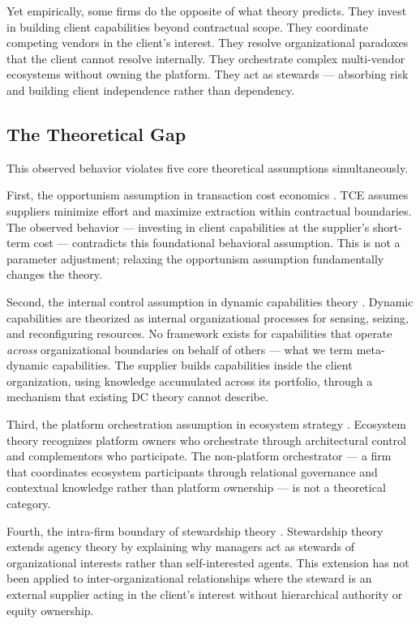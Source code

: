 Yet empirically, some firms do the opposite of what theory predicts. They invest in building client capabilities beyond contractual scope. They coordinate competing vendors in the client's interest. They resolve organizational paradoxes that the client cannot resolve internally. They orchestrate complex multi-vendor ecosystems without owning the platform. They act as stewards --- absorbing risk and building client independence rather than dependency.

\subsection{The Theoretical Gap}

This observed behavior violates five core theoretical assumptions simultaneously.

First, the opportunism assumption in transaction cost economics \citep{Williamson1991, Williamson1993OpportunismCritics}. TCE assumes suppliers minimize effort and maximize extraction within contractual boundaries. The observed behavior --- investing in client capabilities at the supplier's short-term cost --- contradicts this foundational behavioral assumption. This is not a parameter adjustment; relaxing the opportunism assumption fundamentally changes the theory.

Second, the internal control assumption in dynamic capabilities theory \citep{Teece1997, Teece2018}. Dynamic capabilities are theorized as internal organizational processes for sensing, seizing, and reconfiguring resources. No framework exists for capabilities that operate \emph{across} organizational boundaries on behalf of others --- what we term meta-dynamic capabilities. The supplier builds capabilities inside the client organization, using knowledge accumulated across its portfolio, through a mechanism that existing DC theory cannot describe.

Third, the platform orchestration assumption in ecosystem strategy \citep{Gawer2014, Adner2017, Jacobides2018}. Ecosystem theory recognizes platform owners who orchestrate through architectural control and complementors who participate. The non-platform orchestrator --- a firm that coordinates ecosystem participants through relational governance and contextual knowledge rather than platform ownership --- is not a theoretical category.

Fourth, the intra-firm boundary of stewardship theory \citep{Davis1997TowardManagement, Donaldson1991}. Stewardship theory extends agency theory by explaining why managers act as stewards of organizational interests rather than self-interested agents. This extension has not been applied to inter-organizational relationships where the steward is an external supplier acting in the client's interest without hierarchical authority or equity ownership.


